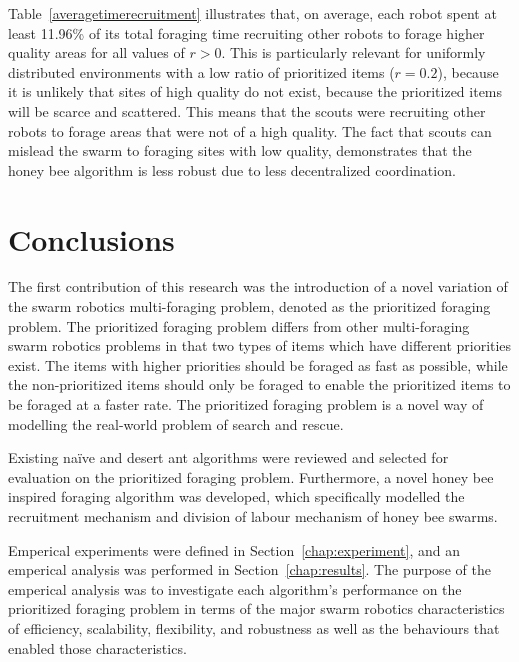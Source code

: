 \documentclass[preprint,12pt]{elsarticle}
\begin{document}
Table~\ref{averagetimerecruitment} illustrates that, on average, each robot spent at least 11.96\% of its total foraging time recruiting other robots to forage higher quality areas for all values of $r > 0$. This is particularly relevant for uniformly distributed environments with a low ratio of prioritized items ($r = 0.2$), because it is unlikely that sites of high quality do not exist, because the prioritized items will be scarce and scattered. This means that the scouts were recruiting other robots to forage areas that were not of a high quality. The fact that scouts can mislead the swarm to foraging sites with low quality, demonstrates that the honey bee algorithm is less robust due to less decentralized coordination.



\section{Conclusions}
\label{Conclusions}

The first contribution of this research was the introduction of a novel variation of the swarm robotics multi-foraging problem, denoted as the prioritized foraging problem. The prioritized foraging problem differs from other multi-foraging swarm robotics problems in that two types of items which have different priorities exist. The items with higher priorities should be foraged as fast as possible, while the non-prioritized items should only be foraged to enable the prioritized items to be foraged at a faster rate. The prioritized foraging problem is a novel way of modelling the real-world problem of search and rescue.  

Existing na\"ive and desert ant algorithms were reviewed and selected for evaluation on the prioritized foraging problem. Furthermore, a novel honey bee inspired foraging algorithm was developed, which specifically modelled the recruitment mechanism and division of labour mechanism of honey bee swarms.

Emperical experiments were defined in Section~\ref{chap:experiment}, and an emperical analysis was performed in Section~\ref{chap:results}. The purpose of the emperical analysis was to investigate each algorithm's performance on the prioritized foraging problem in terms of the major swarm robotics characteristics of efficiency, scalability, flexibility, and robustness as well as the behaviours that enabled those characteristics. 
\end{document}
